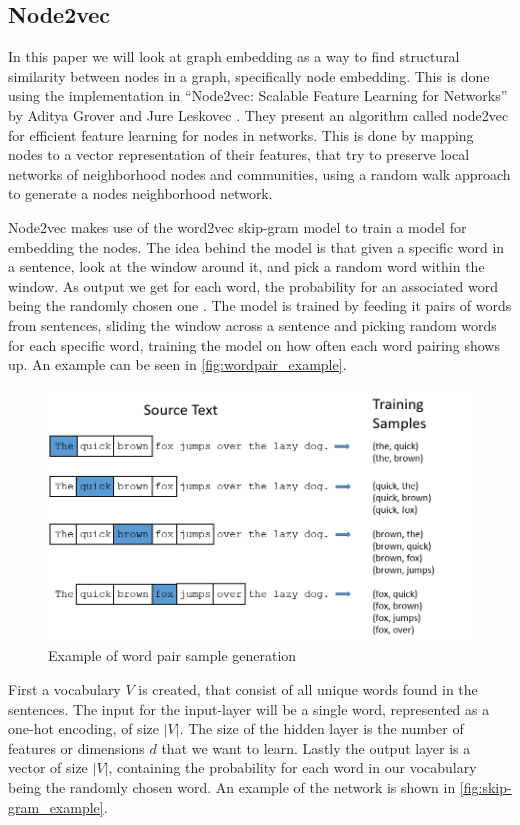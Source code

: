 \subsection{Node2vec}
In this paper we will look at graph embedding as a way to find structural similarity between nodes in a graph, specifically node embedding. This is done using the implementation in “Node2vec: Scalable Feature Learning for Networks” by Aditya Grover and Jure Leskovec \cite{Node2vec}. They present an algorithm called node2vec for efficient feature learning for nodes in networks. This is done by mapping nodes to a vector representation of their features, that try to preserve local networks of neighborhood nodes and communities, using a random walk approach to generate a nodes neighborhood network.

Node2vec makes use of the word2vec skip-gram model to train a model for embedding the nodes.
The idea behind the model is that given a specific word in a sentence, look at the window around it, and pick a random word within the window. As output we get for each word, the probability for an associated word being the randomly chosen one \cite{Word2vec}.
The model is trained by feeding it pairs of words from sentences, sliding the window across a sentence and picking random words for each specific word, training the model on how often each word pairing shows up. An example can be seen in \autoref{fig:wordpair_example}.

\begin{figure}[H]
\centering
  \includegraphics[scale=0.6]{Article/figures/training_data.png}
  \caption{Example of word pair sample generation \cite{Word2vec}}
  \label{fig:wordpair_example}
\end{figure}
First a vocabulary $V$ is created, that consist of all unique words found in the sentences. The input for the input-layer will be a single word, represented as a one-hot encoding, of size $|V|$. The size of the hidden layer is the number of features or dimensions $d$ that we want to learn. Lastly the output layer is a vector of size $|V|$, containing the probability for each word in our vocabulary being the randomly chosen word. An example of the network is shown in \autoref{fig:skip-gram_example}.

